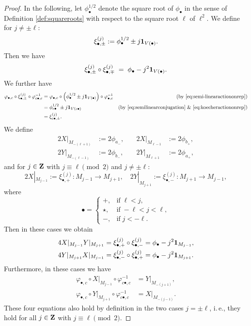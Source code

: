 \documentclass[a4paper,12pt,reqno]{amsart}
\newcommand{\ZZ}{{\rm\bf Z}}
\theoremstyle{plain}
\theoremstyle{remark}
\begin{document}
\begin{proof}
    In the following, let $\phi_\bullet^{1/2}$ denote the square root of $\phi_\bullet$ in the sense of Definition \ref{def:squareroots} with respect to the square root $\ell$ of $\ell^2$. We define for $j\neq\pm\ell$:
    \[
    \xi_{\bullet,\pm}^{(j)}:=\phi_\bullet^{1/2}\pm j{\bf1}_{V(\bullet)}.
    \]
    Then we have
    \begin{equation}
      \xi_{\bullet,\pm}^{(j)}\circ\xi_{\bullet,\mp}^{(j)}
      \;=\;
      \phi_\bullet-j^2{\bf1}_{V(\bullet)}.
    \end{equation}
    We further have
    \begin{align*}
      \varphi_{\bullet,c}\circ
      \xi_{\bullet,\pm}^{(j)}
      \circ\varphi_{c\bullet,c}^{-1}
      &=
      \varphi_{\bullet,c}\circ\left(\phi_\bullet^{1/2}\pm j{\bf1}_{V(\bullet)}\right)\circ\varphi_{\bullet,c}^{-1}
      &\text{(by \eqref{eq:semi-linearactiononrep})}\\
      &=
      \phi_{c\bullet}^{1/2}\pm j{\bf1}_{V(c\bullet)}
      &\text{(by \eqref{eq:semilinearconjugation} \& \eqref{eq:koecheractiononrep})}\\
      &=
      \xi_{c\bullet,\pm}^{(j)}.
    \end{align*}
    We define
    \begin{align*}
      2X|_{M_{-(\ell+1)}}&:=2\phi_{a_-},\quad&
      2X|_{M_{\ell-1}}&:=2\phi_{b_+},\\
      2Y|_{M_{-(\ell-1)}}&:=2\phi_{b_-},\quad&
      2Y|_{M_{\ell+1}}&:=2\phi_{a_+},
    \end{align*}
    and for $j\in\ZZ$ with $j\equiv\ell\pmod{2}$ and $j\neq\pm\ell$:
    \[
    2X|_{M_{j-1}}:=\xi_{\bullet,+}^{(j)}\colon M_{j-1}\to M_{j+1},
    \quad
    2Y|_{M_{j+1}}:=\xi_{\bullet,-}^{(j)}\colon M_{j+1}\to M_{j-1},
    \]
    where
    \[
    \bullet=
    \begin{cases}
      +,&\text{if}\;\ell<j,\\
      \star,&\text{if}\;-\ell<j<\ell,\\
      -,&\text{if}\;j<-\ell.
    \end{cases}
    \]
    Then in these cases we obtain
    \begin{align}
      4X|_{M_{j-1}}Y|_{M_{j+1}}&=\xi_{\bullet,+}^{(j)}\circ\xi_{\bullet,-}^{(j)}=\phi_\bullet-j^2{\bf1}_{M_{j-1}},\label{eq:4XY2}\\
      4Y|_{M_{j+1}}X|_{M_{j-1}}&=\xi_{\bullet,-}^{(j)}\circ\xi_{\bullet,+}^{(j)}=\phi_\bullet-j^2{\bf1}_{M_{j+1}}.\label{eq:4YX2}
    \end{align}
    Furthermore, in these cases we have
    \begin{align}
      \varphi_{\bullet,c}\circ
      X|_{M_{j-1}}
      \circ\varphi_{c\bullet,c}^{-1}
      &=Y|_{M_{-(j+1)}},\label{eq:Xconjugation}\\
      \varphi_{\bullet,c}\circ
      Y|_{M_{j+1}}
      \circ\varphi_{c\bullet,c}^{-1}
      &=X|_{M_{-(j-1)}}.\label{eq:Yconjugation}
    \end{align}
    These four equations also hold by definition in the two cases $j=\pm\ell$, i.\,e., they hold for all $j\in\ZZ$ with $j\equiv\ell\pmod{2}$.
      

\end{proof}
\end{document}
